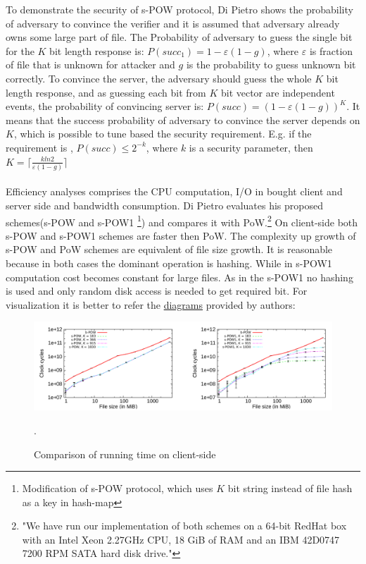 \documentclass[12pt]{article}
\begin{document}
To demonstrate the security of s-POW protocol, Di Pietro shows the probability of adversary to convince the verifier and it is assumed that adversary already owns some large part of file. The Probability of adversary to guess the single bit for the $K$ bit length response is: $P(succ_1) = 1-\varepsilon(1-g)$, where $\varepsilon$ is fraction of file that is unknown for attacker and $g$ is the probability to guess unknown bit correctly. To convince the server, the adversary should guess the whole $K$ bit length response, and as guessing each bit from $K$ bit vector are independent events, the probability of convincing server is: $P(succ) = (1-\varepsilon(1-g))^K$. It means that the success probability  of adversary to convince the server depends on $K$, which is possible to tune based the security requirement. E.g. if the requirement is , $P(succ)\leq2^{-k}$, where $k$ is a security parameter, then $K =\lceil \frac{k ln 2}{\varepsilon(1-g)} \rceil $\\\\
Efficiency analyses comprises  the CPU computation, I/O  in bought client and server side and bandwidth consumption. Di Pietro evaluates his proposed schemes(s-POW and s-POW1 \footnote{Modification of s-POW protocol, which uses $K$ bit string  instead of file hash as a key in hash-map}) and compares it with PoW.\footnote{"We have run our implementation of both schemes on a 64-bit RedHat box with an Intel Xeon 2.27GHz CPU, 18 GiB of RAM and an IBM 42D0747 7200 RPM SATA hard disk drive.\cite{DiPietro}"} On client-side both s-POW and s-POW1 schemes are faster then PoW. The complexity up growth of s-POW and PoW schemes are equivalent of file size growth. It is reasonable because in both cases the dominant operation is hashing. While in s-POW1 computation cost becomes  constant for large files. As in the s-POW1 no hashing is used and only random disk access is needed to get required bit. For  visualization it is better to refer  the \hyperref[fig:POWvsPoW]{diagrams} provided by authors:
\begin{figure}[ht] 
\begin{center}
\includegraphics[width=1.0\textwidth]{POWvsPoW}
\caption{Comparison of running time on client-side \cite{DiPietro}}
\label{fig:POWvsPoW} .
\end{center}
\end{figure}
\end{document}
